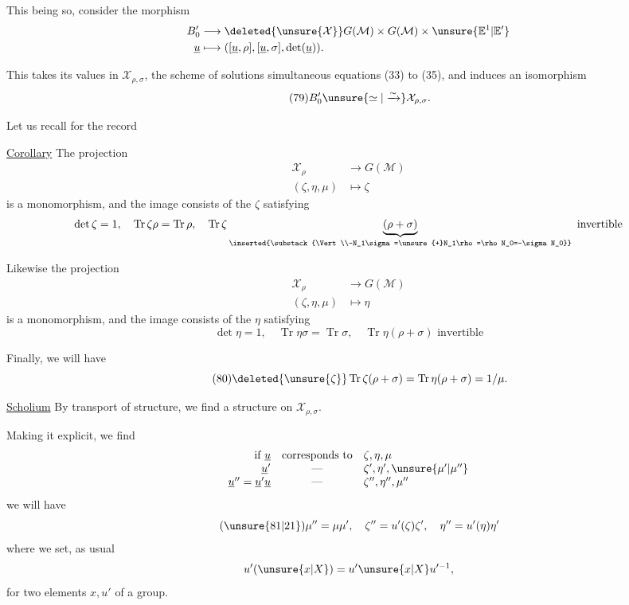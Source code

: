 This being so, consider the morphism
\[
\begin{aligned}
B'_0&\longrightarrow\deleted{\unsure{\mathcal X}}G(\mathcal M)\times G(\mathcal M)\times\unsure{\mathbb E^1|\mathbb E'}\\
\underline u&\longmapsto([\underline u,\rho],[\underline u,\sigma],\det(\underline u)).
\end{aligned}
\]


This takes its values in $\mathcal X_{\rho,\sigma}$, the scheme of solutions  simultaneous equations (33) to (35), and induces an isomorphism
\[
\tag{79}B'_0\unsure{\simeq|\xrightarrow{\sim}}\mathcal X_{\rho,\sigma}.
\]

 Let us recall  for the record

\uline{Corollary} The projection
\[
\begin{aligned}
\mathcal X_\rho&\longrightarrow G(\mathcal M)\\
(\zeta,\eta,\mu)&\longmapsto\zeta
\end{aligned}
\]
is a monomorphism, and the image consists of the $\zeta$ satisfying
\[
\det\zeta=1,\quad \operatorname{Tr}\zeta\rho=\operatorname{Tr}\rho,\quad \operatorname{Tr}\zeta\underbrace{(\rho+\sigma)}_{\inserted{\substack{\Vert\\-N_1\sigma=\unsure{+}N_1\rho=\rho N_0=-\sigma N_0}}}\text{ invertible}
\]

Likewise the projection
\[
\begin{aligned}
\mathcal X_\rho&\longrightarrow G(\mathcal M)\\
(\zeta,\eta,\mu)&\longmapsto\eta
\end{aligned}
\]
is a monomorphism, and the image consists of the $\eta$ satisfying
\[
\det\eta=1,\quad\operatorname{Tr}\eta\sigma=\operatorname{Tr}\sigma,\quad\operatorname{Tr}\eta(\rho+\sigma)\text{ invertible}
\]

Finally, we will have
\[
\tag{80}\deleted{\unsure{\zeta}}\operatorname{Tr}\zeta(\rho+\sigma)=\operatorname{Tr}\eta(\rho+\sigma)=1/\mu.
\]

\uline{Scholium} By transport of structure, we find a  structure on $\mathcal X_{\rho,\sigma}$.


Making it explicit, we find
\[
\begin{array}{rcl}
\text{if }\underline u&\text{corresponds to}&\zeta,\eta,\mu\\
\underline u'&\text{---}&\zeta',\eta',\unsure{\mu'|\mu''}\\
\underline u''=\underline u'\underline u&\text{---}&\zeta'',\eta'',\mu''
\end{array}
\]
we will have
\[
\tag{\unsure{81|21}}\mu''=\mu\mu',\quad\zeta''=u'(\zeta)\zeta',\quad\eta''=u'(\eta)\eta'
\]
where we set, as usual
\[
u'(\unsure{x|X})=u'\unsure{x|X}u'^{-1},
\]
for two elements $x,u'$ of a group.

